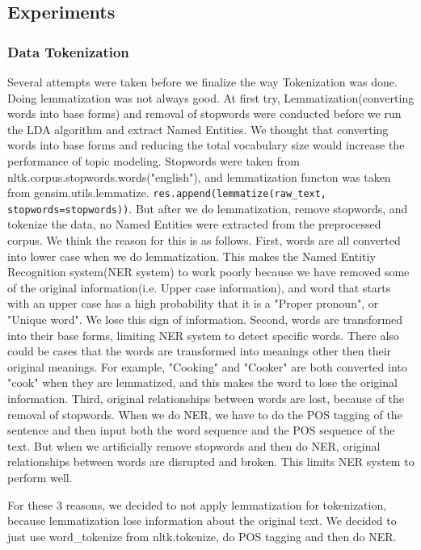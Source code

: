 \subsection{Experiments}
\subsubsection{Data Tokenization}
Several attempts were taken before we finalize the way Tokenization was done. Doing lemmatization was not always good.
At first try, Lemmatization(converting words into base forms) and removal of stopwords were conducted before we run the LDA algorithm and extract Named Entities. We thought that converting words into base forms and reducing the total vocabulary size would increase the performance of topic modeling. Stopwords were taken from nltk.corpus.stopwords.words("english"), and lemmatization functon was taken from
gensim.utils.lemmatize.
\texttt{res.append(lemmatize(raw\_text, stopwords=stopwords))}. But after we do lemmatization, remove stopwords, and tokenize the data, no Named Entities were extracted from the preprocessed corpus. We think the reason for this is as follows. 
First, words are all converted into lower case when we do lemmatization. This makes the Named Entitiy Recognition system(NER system) to work poorly because we have removed some of the original information(i.e. Upper case information), and word that starts with an upper case has a high probability that it is a "Proper pronoun", or "Unique word". We lose this sign of information.
Second, words are transformed into their base forms, limiting NER system to detect specific words. There also could be cases that the words are transformed into meanings other then their original meanings. For example, "Cooking" and "Cooker" are both converted into "cook" when they are lemmatized, and this makes the word to lose the original information.
Third, original relationships between words are lost, because of the removal of stopwords. When we do NER, we have to do the POS tagging of the sentence and then input both the word sequence and the POS sequence of the text. But when we artificially remove stopwords and then do NER, original relationships between words are disrupted and broken. This limits NER system to perform well.

For these 3 reasons, we decided to not apply lemmatization for tokenization, because lemmatization lose information about the original text. We decided to just use word\_tokenize from nltk.tokenize, do POS tagging and then do NER.


